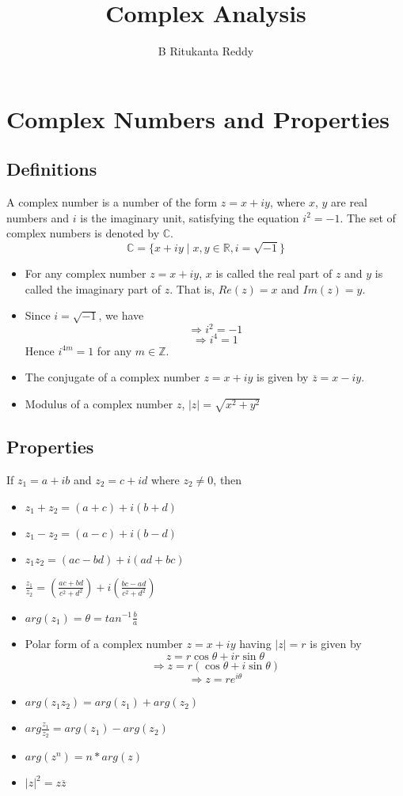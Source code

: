 \documentclass{article}
\title{Complex Analysis}
\author{B Ritukanta Reddy}
\begin{document}
\maketitle

\section{Complex Numbers and Properties}
\subsection{Definitions}

A complex number is a number of the form $z=x + iy$, where $x$, $y$ are real numbers and $i$ is the imaginary unit, satisfying the equation $i^2 = -1$. The set of complex numbers is denoted by $\mathbb{C}$.
\\
\[
\boxed{\mathbb{C} = \{x+iy \mid x,y \in \mathbb{R}, i=\sqrt{-1}\}}
\]
\begin{itemize}
    \item For any complex number $z=x+iy$, $x$ is called the real part of $z$ and $y$ is called the imaginary part of $z$. That is, $Re(z)=x$ and $Im(z)=y$.
    \item Since $i=\sqrt{-1}$, we have
    \[
    \Rightarrow i^2=-1
    \]
    \[
    \Rightarrow i^4=1
    \]
    Hence $i^{4m}=1$ for any $m\in \mathbb{Z}$.
    \item The conjugate of a complex number $z=x+iy$ is given by $\overline{z}=x-iy$. 
    \item Modulus of a complex number $z$, $|z|=\sqrt{x^2+y^2}$
\end{itemize}

\subsection{Properties}
If $z_1=a+ib$ and $z_2=c+id$ where $z_2 \neq 0$, then
\begin{itemize}
    \item $z_1+z_2=(a+c)+i(b+d)$
    \item $z_1-z_2=(a-c)+i(b-d)$
    \item $z_1 z_2=(ac-bd)+i(ad+bc)$
    \item $\frac{z_1}{z_2}=(\frac{ac+bd}{c^2+d^2})+i (\frac{bc-ad}{c^2+d^2})$
    \item $arg(z_1)= \theta=tan^{-1} \frac{b}{a}$
    \item Polar form of a complex number $z=x+iy$ having $|z|=r$ is given by 
    \[
    z=r\cos\theta+ir\sin\theta
    \]
    \[
    \Rightarrow z=r(\cos\theta+i\sin\theta)
    \]
    \[
    \Rightarrow z=re^{i\theta}
    \]
    \item $arg(z_1 z_2)=arg(z_1)+arg(z_2)$
    \item $arg \frac{z_1}{z_2}=arg(z_1)-arg(z_2)$
    \item $arg(z^n)=n*arg(z)$
    \item $|z|^2=z\overline{z}$%
\end{itemize}
\end{document}
